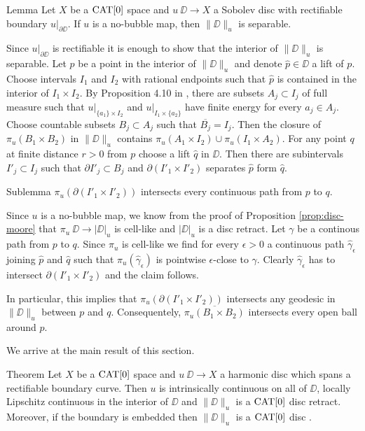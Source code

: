 \documentclass[a4paper,10pt]{amsart}
\begin{document}
\begin{thm}{Lemma}\label{lem:separable}
Let $X$ be a $\mathop{\rm CAT}\nolimits[0]$ space 
and $u\:\DD\to X$ a Sobolev disc with rectifiable boundary $u|_{\partial \DD}$.
If $u$ is a no-bubble map, then $\|\DD\|_u$ is separable.
\end{thm}

Since $u|_{\partial \DD}$ is rectifiable it is enough to show that 
the interior of $\|\DD\|_u$ is separable. Let $p$ be a point in the interior of $\|\DD\|_u$ and denote $\hat p\in\DD$ 
a lift of $p$. Choose intervals $I_1$ and $I_2$ with rational endpoints such that $\hat p$ is contained in the interior of $I_1\times I_2$.
By Proposition 4.10 in \cite{LW}, there are subsets $A_j\subset I_j$ of full measure such that $u|_{\{a_1\}\times I_2}$
and $u|_{I_1\times \{a_2\}}$ have finite energy for every $a_j\in A_j$. Choose countable subsets $B_j\subset A_j$
such that $\overline{B_j}=I_j$. Then the closure of $\pi_u(B_1\times B_2)$ in $\|\DD\|_u$ contains 
$\pi_u(A_1\times I_2)\cup \pi_u(I_1\times A_2)$.
For any point $q$ at finite distance $r>0$ from $p$ choose a lift $\hat q$ in $\DD$. Then there are subintervals $I'_j\subset I_j$
such that $\partial I'_j\subset B_j$ and $\partial( I'_1\times I'_2)$ separates $\hat p$ form $\hat q$.
\begin{thm}{Sublemma}\label{sublem:separating}
$\pi_u(\partial( I'_1\times I'_2))$ intersects every continuous path from $p$ to $q$.
\end{thm}

Since $u$ is a no-bubble map, we know from the proof of Proposition \ref{prop:disc-moore} that $\pi_u\:\DD\to|\DD|_u$ is cell-like and 
$|\DD|_u$ is a disc retract. 
Let $\gamma$ be a continous path from $p$ to $q$. Since $\pi_u$ is cell-like we find for every $\epsilon>0$ a continuous path $\hat\gamma_\epsilon$ joining $\hat p$
and $\hat q$ such that $\pi_u(\hat\gamma_\epsilon)$ is pointwise $\epsilon$-close to $\gamma$. Clearly $\hat\gamma_\epsilon$ has to intersect 
$\partial( I'_1\times I'_2)$ and the claim follows.
\qeds

In particular, this implies that $\pi_u(\partial( I'_1\times I'_2))$ intersects any geodesic in $\|\DD\|_u$ between $p$ and $q$. 
Consequentely, $\overline{\pi_u(B_1\times B_2)}$ intersects every open ball around $p$.
\qeds





We arrive at the main result of this section.


\begin{thm}{Theorem}\label{thm:harmonic}
Let $X$ be a $\mathop{\rm CAT}\nolimits[0]$ space 
and $u\:\DD\to X$ a harmonic disc which spans a rectifiable boundary curve. 
Then $u$ is intrinsically continuous on all of $\DD$, locally Lipschitz continuous in the interior of $\DD$ and $\|\DD\|_u$ is a $\mathop{\rm CAT}\nolimits[0]$ disc retract. 
Moreover, if the boundary is embedded then $\|\DD\|_u$ is a $\mathop{\rm CAT}\nolimits[0]$ disc .
\end{thm}
\end{document}
